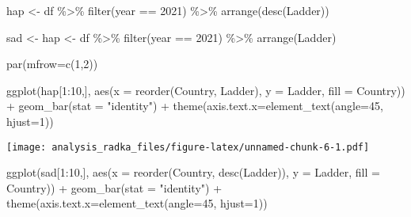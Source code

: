 \documentclass[
]{article}
\newenvironment{Shaded}{\begin{snugshade}}{\end{snugshade}}
\newcommand{\AttributeTok}[1]{\textcolor[rgb]{0.77,0.63,0.00}{#1}}
\newcommand{\DecValTok}[1]{\textcolor[rgb]{0.00,0.00,0.81}{#1}}
\newcommand{\FunctionTok}[1]{\textcolor[rgb]{0.00,0.00,0.00}{#1}}
\newcommand{\NormalTok}[1]{#1}
\newcommand{\OtherTok}[1]{\textcolor[rgb]{0.56,0.35,0.01}{#1}}
\newcommand{\SpecialCharTok}[1]{\textcolor[rgb]{0.00,0.00,0.00}{#1}}
\newcommand{\StringTok}[1]{\textcolor[rgb]{0.31,0.60,0.02}{#1}}
\begin{document}
\begin{Shaded}
\begin{Highlighting}[]
\NormalTok{hap }\OtherTok{\textless{}{-}}\NormalTok{ df }\SpecialCharTok{\%\textgreater{}\%} 
  \FunctionTok{filter}\NormalTok{(year }\SpecialCharTok{==} \DecValTok{2021}\NormalTok{) }\SpecialCharTok{\%\textgreater{}\%}
  \FunctionTok{arrange}\NormalTok{(}\FunctionTok{desc}\NormalTok{(Ladder))}
  
\NormalTok{sad }\OtherTok{\textless{}{-}}\NormalTok{ hap }\OtherTok{\textless{}{-}}\NormalTok{ df }\SpecialCharTok{\%\textgreater{}\%} 
  \FunctionTok{filter}\NormalTok{(year }\SpecialCharTok{==} \DecValTok{2021}\NormalTok{) }\SpecialCharTok{\%\textgreater{}\%}
  \FunctionTok{arrange}\NormalTok{(Ladder)}


\FunctionTok{par}\NormalTok{(}\AttributeTok{mfrow=}\FunctionTok{c}\NormalTok{(}\DecValTok{1}\NormalTok{,}\DecValTok{2}\NormalTok{)) }


\FunctionTok{ggplot}\NormalTok{(hap[}\DecValTok{1}\SpecialCharTok{:}\DecValTok{10}\NormalTok{,], }\FunctionTok{aes}\NormalTok{(}\AttributeTok{x =} \FunctionTok{reorder}\NormalTok{(Country, Ladder), }\AttributeTok{y =}\NormalTok{ Ladder, }\AttributeTok{fill =}\NormalTok{ Country)) }\SpecialCharTok{+} 
  \FunctionTok{geom\_bar}\NormalTok{(}\AttributeTok{stat =} \StringTok{"identity"}\NormalTok{) }\SpecialCharTok{+} 
  \FunctionTok{theme}\NormalTok{(}\AttributeTok{axis.text.x=}\FunctionTok{element\_text}\NormalTok{(}\AttributeTok{angle=}\DecValTok{45}\NormalTok{, }\AttributeTok{hjust=}\DecValTok{1}\NormalTok{))}
\end{Highlighting}
\end{Shaded}

\texttt{[image: analysis\_radka\_files/figure-latex/unnamed-chunk-6-1.pdf]}

\begin{Shaded}
\begin{Highlighting}[]
\FunctionTok{ggplot}\NormalTok{(sad[}\DecValTok{1}\SpecialCharTok{:}\DecValTok{10}\NormalTok{,], }\FunctionTok{aes}\NormalTok{(}\AttributeTok{x =} \FunctionTok{reorder}\NormalTok{(Country, }\FunctionTok{desc}\NormalTok{(Ladder)), }\AttributeTok{y =}\NormalTok{ Ladder, }\AttributeTok{fill =}\NormalTok{ Country)) }\SpecialCharTok{+} 
  \FunctionTok{geom\_bar}\NormalTok{(}\AttributeTok{stat =} \StringTok{"identity"}\NormalTok{) }\SpecialCharTok{+} 
  \FunctionTok{theme}\NormalTok{(}\AttributeTok{axis.text.x=}\FunctionTok{element\_text}\NormalTok{(}\AttributeTok{angle=}\DecValTok{45}\NormalTok{, }\AttributeTok{hjust=}\DecValTok{1}\NormalTok{))}
\end{Highlighting}
\end{Shaded}
\end{document}
